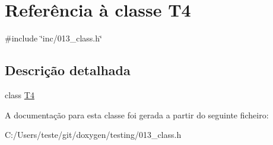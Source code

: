 \hypertarget{class_t4}{\section{Referência à classe T4}
\label{class_t4}
}


{\ttfamily \#include \char`\"{}inc/013\-\_\-class.\-h\char`\"{}}



\subsection{Descrição detalhada}
class \hyperlink{class_t4}{T4} 

A documentação para esta classe foi gerada a partir do seguinte ficheiro\-:\begin{DoxyCompactItemize}
\item 
C\-:/\-Users/teste/git/doxygen/testing/013\-\_\-class.\-h\end{DoxyCompactItemize}
